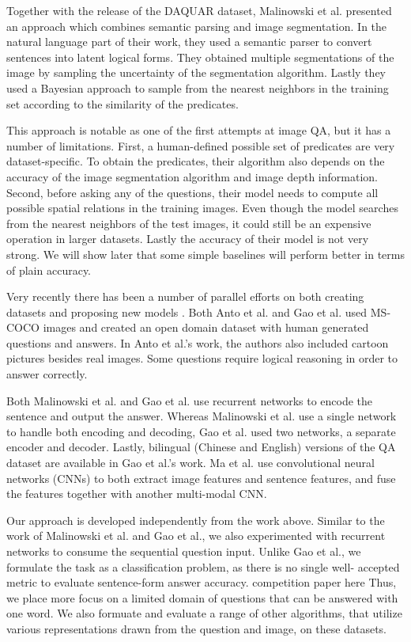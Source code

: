 \documentclass{article} %
\renewcommand{\#}[1]{\textbf{#1}}
\begin{document}
Together with the release of the DAQUAR dataset, Malinowski et al. presented
an approach which combines semantic parsing and image segmentation. In the
natural  language part of their work, they used a semantic parser
\cite{liang13} to convert  sentences into latent logical forms. They obtained
multiple segmentations of the  image by sampling the uncertainty of the
segmentation algorithm. Lastly they used  a Bayesian approach to sample from
the nearest neighbors in the  training set according to the similarity of the
predicates.

This approach is notable as one of the first attempts at image QA,  but it has
a number of limitations. First, a human-defined possible  set of predicates are
very dataset-specific. To obtain the  predicates, their algorithm also depends
on the accuracy of the image  segmentation algorithm and image depth
information. Second, before  asking any of the questions, their model needs to
compute all possible  spatial relations in the training images. Even though the
model  searches from the nearest neighbors of the test images, it  could still
be an expensive  operation in larger datasets. Lastly the accuracy of their
model is  not very strong. We will show later that some simple baselines will
perform better in terms of plain accuracy.

Very recently there has been a number of parallel efforts on both  creating
datasets and proposing new models  \cite{antol14, malinowski15, gao15, ma15}.
Both Anto et al.  \cite{antol14} and Gao et al. \cite{gao15} used MS-COCO
\cite{mscoco} images and created an  open domain dataset with human generated
questions and answers. In  Anto et al.'s work, the authors also included
cartoon pictures  besides real images. Some questions require logical reasoning
in order to answer correctly.

Both Malinowski et al. \cite{malinowski15} and Gao et al. \cite{gao15}  use
recurrent networks to encode the  sentence and output the answer. Whereas
Malinowski et al. use a single  network to handle both encoding and decoding,
Gao et al. used two networks, a separate encoder and decoder. Lastly, bilingual
(Chinese and English)  versions of the QA dataset are available in Gao et al.'s
work.  Ma et al. \cite{ma15} use convolutional neural networks (CNNs)  to both
extract image  features and sentence features, and fuse the features together
with another  multi-modal CNN.

Our approach is developed independently from the work above.  Similar to the
work of Malinowski et al. and Gao et al., we also experimented with recurrent
networks to consume the sequential question input. Unlike Gao et al., we
formulate the task as a classification problem, as there is no single well-
accepted metric to evaluate sentence-form answer accuracy. \cite{mscoco_captions}
competition paper here Thus, we place more focus on a limited domain of
questions that  can be answered with one word. We also formuate and evaluate a
range of other algorithms, that utilize various representations drawn from the
question and image, on these datasets.
\end{document}
